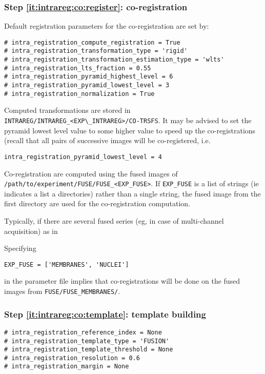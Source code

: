 \subsubsection{Step \ref{it:intrareg:co:register}: co-registration}
\label{sec:cli:intraregistration:coregistration}
Default registration parameters for the co-registration are set by:
\begin{verbatim}
# intra_registration_compute_registration = True
# intra_registration_transformation_type = 'rigid'
# intra_registration_transformation_estimation_type = 'wlts'
# intra_registration_lts_fraction = 0.55
# intra_registration_pyramid_highest_level = 6
# intra_registration_pyramid_lowest_level = 3
# intra_registration_normalization = True
\end{verbatim}
Computed transformations are stored in \verb|INTRAREG/INTRAREG_<EXP\_INTRAREG>/CO-TRSFS|.
It may be advised to set the pyramid lowest level value to some higher value to speed up the co-registrations (recall that all pairs of successive images will be co-registered, i.e.
\begin{verbatim}
intra_registration_pyramid_lowest_level = 4
\end{verbatim}

Co-registration are computed using the fused images of
\texttt{/path/to/experiment/FUSE/FUSE\_<EXP\_FUSE>}. If
\texttt{EXP\_FUSE} is a list of strings (ie indicates a list a
directories) rather than a single string, the fused image from the
first directory are used for the co-registration computation.

Typically, if there are several fused series (eg, in case of multi-channel
acquisition) as in

\mbox{}
\mbox{}

Specifying
\begin{verbatim}
EXP_FUSE = ['MEMBRANES', 'NUCLEI']
\end{verbatim}
in the parameter file implies that co-registrations will be done on
the fused images from \texttt{FUSE/FUSE\_MEMBRANES/}.



\subsubsection{Step \ref{it:intrareg:co:template}: template building}
\label{sec:cli:intraregistration:template}

\begin{verbatim}
# intra_registration_reference_index = None
# intra_registration_template_type = 'FUSION'
# intra_registration_template_threshold = None
# intra_registration_resolution = 0.6
# intra_registration_margin = None
\end{verbatim}

